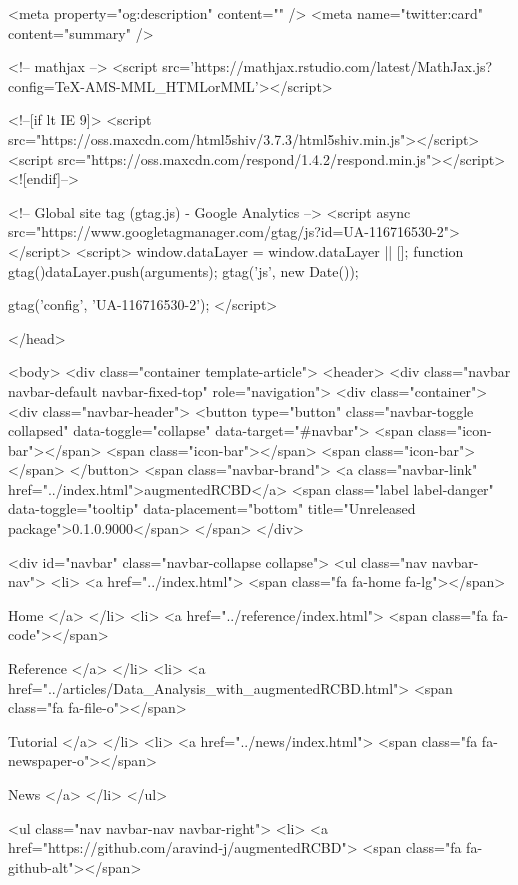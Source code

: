 <meta property="og:description" content="" />
<meta name="twitter:card" content="summary" />



<!-- mathjax -->
<script src='https://mathjax.rstudio.com/latest/MathJax.js?config=TeX-AMS-MML_HTMLorMML'></script>

<!--[if lt IE 9]>
<script src="https://oss.maxcdn.com/html5shiv/3.7.3/html5shiv.min.js"></script>
<script src="https://oss.maxcdn.com/respond/1.4.2/respond.min.js"></script>
<![endif]-->


<!-- Global site tag (gtag.js) - Google Analytics -->
<script async src="https://www.googletagmanager.com/gtag/js?id=UA-116716530-2"></script>
<script>
  window.dataLayer = window.dataLayer || [];
  function gtag(){dataLayer.push(arguments);}
  gtag('js', new Date());

  gtag('config', 'UA-116716530-2');
</script>

  </head>

  <body>
    <div class="container template-article">
      <header>
      <div class="navbar navbar-default navbar-fixed-top" role="navigation">
  <div class="container">
    <div class="navbar-header">
      <button type="button" class="navbar-toggle collapsed" data-toggle="collapse" data-target="#navbar">
        <span class="icon-bar"></span>
        <span class="icon-bar"></span>
        <span class="icon-bar"></span>
      </button>
      <span class="navbar-brand">
        <a class="navbar-link" href="../index.html">augmentedRCBD</a>
        <span class="label label-danger" data-toggle="tooltip" data-placement="bottom" title="Unreleased package">0.1.0.9000</span>
      </span>
    </div>

    <div id="navbar" class="navbar-collapse collapse">
      <ul class="nav navbar-nav">
        <li>
  <a href="../index.html">
    <span class="fa fa-home fa-lg"></span>
     
    Home
  </a>
</li>
<li>
  <a href="../reference/index.html">
    <span class="fa fa-code"></span>
     
    Reference
  </a>
</li>
<li>
  <a href="../articles/Data_Analysis_with_augmentedRCBD.html">
    <span class="fa fa-file-o"></span>
     
    Tutorial
  </a>
</li>
<li>
  <a href="../news/index.html">
    <span class="fa fa-newspaper-o"></span>
     
    News
  </a>
</li>
      </ul>
      
      <ul class="nav navbar-nav navbar-right">
        <li>
  <a href="https://github.com/aravind-j/augmentedRCBD">
    <span class="fa fa-github-alt"></span>
     
